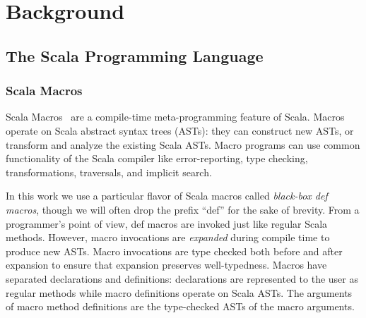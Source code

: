 


\chapter{Background }
\label{ch:background}

\section{The Scala Programming Language}
\label{sec:scala}


\subsection{Scala Macros}
\label{sec:scala-macros}

Scala Macros~\cite{burmako_scala_2013} are a compile-time meta-programming
 feature of Scala. Macros operate on Scala abstract syntax trees (ASTs): they
 can construct new ASTs, or transform and analyze the existing Scala ASTs.
 Macro programs can use common functionality of the Scala compiler like
 error-reporting, type checking, transformations, traversals, and implicit
 search.

In this work we use a particular flavor of Scala macros called \emph{black-box def
 macros}, though we will often drop the prefix ``def'' for the
 sake of brevity.  From a programmer's point of view, def macros
 are invoked just like regular Scala methods.  However, macro
 invocations are \emph{expanded} during compile time to produce new
 ASTs.  Macro invocations are type checked both before and after
 expansion to ensure that expansion preserves well-typedness.  Macros
 have separated declarations and definitions: declarations are
 represented to the user as regular methods while macro definitions
 operate on Scala ASTs.  The arguments of macro method definitions are
 the type-checked ASTs of the macro arguments.

